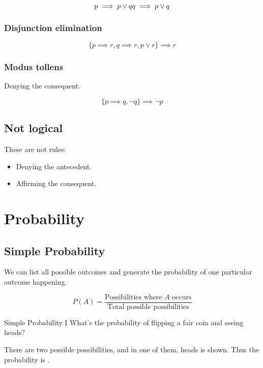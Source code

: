 \documentclass[a4paper,10pt]{report}
\begin{document}
\begin{equation*}
 p \implies p \lor q \\
 q \implies p \lor q
\end{equation*}

\subsection{Disjunction elimination}

\begin{equation*}
 \{p \implies r, q \implies r, p \lor r\} \implies r
\end{equation*}

\subsection{Modus tollens}

Denying the consequent.

\begin{equation*}
 \{p \implies q, \lnot q\} \implies \lnot p
\end{equation*}

\section{Not logical}
These are not rules:

\begin{itemize}
 \item Denying the antecedent.
 \item Affirming the consequent.
\end{itemize}

\chapter{Probability}


\section{Simple Probability}

We can list all possible outcomes and generate the probability of one particular
outcome happening.

\begin{equation}
 P(A) = \frac{\text{Possibilities where $A$ occurs}}
 {\text{Total possible possibilities}}
\end{equation}


\begin{problem}{Simple Probability I}
 What's the probability of flipping a fair coin and seeing heads?

 \begin{solution}
  There are two possible possibilities, and in one of them, heads is shown. Thus
  the probability is .
 \end{solution}
\end{problem}
\end{document}
